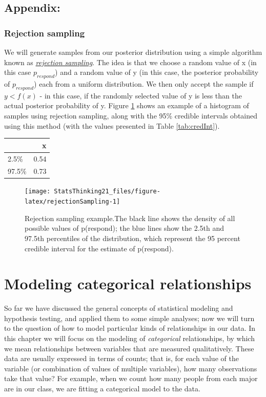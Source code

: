 \documentclass[
  12pt,
]{book}
\begin{document}
\hypertarget{appendix-3}{%
\section{Appendix:}\label{appendix-3}}

\hypertarget{rejection-sampling}{%
\subsection{Rejection sampling}\label{rejection-sampling}}

We will generate samples from our posterior distribution using a simple algorithm known as \href{https://am207.github.io/2017/wiki/rejectionsampling.html}{\emph{rejection sampling}}. The idea is that we choose a random value of x (in this case \(p_{respond}\)) and a random value of y (in this case, the posterior probability of \(p_{respond}\)) each from a uniform distribution. We then only accept the sample if \(y < f(x)\) - in this case, if the randomly selected value of y is less than the actual posterior probability of y. Figure \ref{fig:rejectionSampling} shows an example of a histogram of samples using rejection sampling, along with the 95\% credible intervals obtained using this method (with the values presented in Table \ref{tab:credInt}).

\begin{tabular}{l|r}
\hline
  & x\\
\hline
2.5\% & 0.54\\
\hline
97.5\% & 0.73\\
\hline
\end{tabular}

\begin{figure}
\texttt{[image: StatsThinking21\_files/figure-latex/rejectionSampling-1]} \caption{Rejection sampling example.The black line shows the density of all possible values of p(respond); the blue lines show the 2.5th and 97.5th percentiles of the distribution, which represent the 95 percent credible interval for the estimate of p(respond).}\label{fig:rejectionSampling}
\end{figure}

\hypertarget{modeling-categorical-relationships}{%
\chapter{Modeling categorical relationships}\label{modeling-categorical-relationships}}

So far we have discussed the general concepts of statistical modeling and hypothesis testing, and applied them to some simple analyses; now we will turn to the question of how to model particular kinds of relationships in our data. In this chapter we will focus on the modeling of \emph{categorical} relationships, by which we mean relationships between variables that are measured qualitatively. These data are usually expressed in terms of counts; that is, for each value of the variable (or combination of values of multiple variables), how many observations take that value? For example, when we count how many people from each major are in our class, we are fitting a categorical model to the data.
\end{document}
